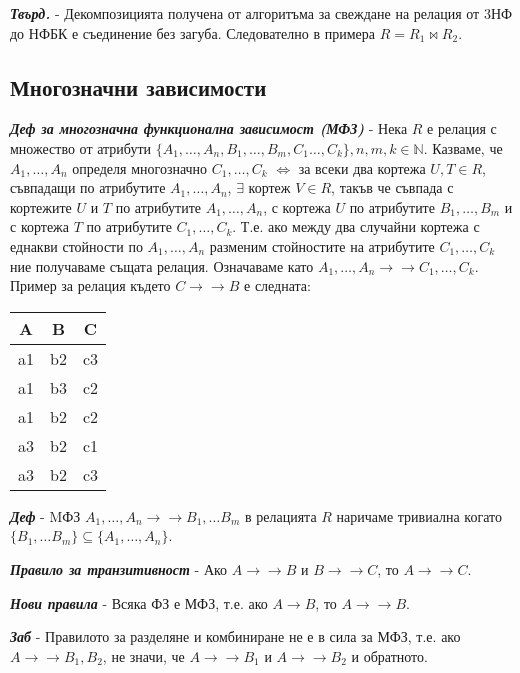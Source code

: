 \documentclass[fleqn,12pt]{article}
\begin{document}
\textbf{\textit{Твърд.}} - Декомпозицията получена от алгоритъма за свеждане на релация от 3НФ до НФБК е съединение без загуба.
Следователно в примера $R = R_1 \bowtie R_2$.

\subsection{Многозначни зависимости}

\textbf{\textit{Деф за многозначна функционална зависимост (МФЗ)}} - Нека $R$ е релация с множество от атрибути $\{A_1, \dots, A_n, B_1, \dots, B_m, C_1 \dots, C_k\}, n, m, k \in \mathbb{N}$.
Казваме, че $A_1, \dots, A_n$ определя многозначно $C_1, \dots, C_k$ $\iff$ за всеки два кортежа $U, T \in R$, съвпадащи по атрибутите $A_1, \dots, A_n$, $\exists$ кортеж $V \in R$, такъв че съвпада с кортежите $U$ и $T$ по атрибутите $A_1, \dots, A_n$, с кортежа $U$ по атрибутите $B_1, \dots, B_m$ и с кортежа $T$ по атрибутите $C_1, \dots, C_k$.
Т.е. ако между два случайни кортежа с еднакви стойности по $A_1, \dots, A_n$ разменим стойностите на атрибутите $C_1, \dots, C_k$ ние получаваме същата релация.
Означаваме като $A_1, \dots, A_n \rightarrow \rightarrow C_1, \dots, C_k$.
\bigbreak
Пример за релация където $C \rightarrow \rightarrow B$ е следната:

\begin{center}
\begin{tabular}{ |c|c|c| } 
    \hline
    A & B & C \\
    \hline
    a1 & b2 & c3 \\ 
    a1 & b3 & c2 \\ 
    a1 & b2 & c2 \\ 
    a3 & b2 & c1 \\
    a3 & b2 & c3 \\
    \hline
\end{tabular}
\end{center}

\textbf{\textit{Деф}} - MФЗ $A_1, \dots, A_n \rightarrow \rightarrow B_1, \dots B_m$ в релацията $R$ наричаме тривиална когато $\{B_1, \dots B_m\} \subseteq \{A_1, \dots, A_n\}$.

\textbf{\textit{Правило за транзитивност}} - Ако $A \rightarrow \rightarrow B$ и $B \rightarrow \rightarrow C$, то $A \rightarrow \rightarrow C$.

\textbf{\textit{Нови правила}} - Всяка ФЗ е МФЗ, т.е. ако $A \rightarrow B$, то $A \rightarrow \rightarrow B$.

\textbf{\textit{Заб}} - Правилото за разделяне и комбиниране не е в сила за МФЗ, т.е. ако $A \rightarrow \rightarrow B_1, B_2$, не значи, че $A \rightarrow \rightarrow B_1$ и $A \rightarrow \rightarrow B_2$ и обратното.
\end{document}
